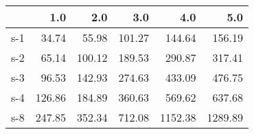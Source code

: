 \begin{tabular}{lrrrrr}
\toprule
{} &    1.0 &    2.0 &    3.0 &     4.0 &     5.0 \\
\midrule
s-1 &  34.74 &  55.98 & 101.27 &  144.64 &  156.19 \\
s-2 &  65.14 & 100.12 & 189.53 &  290.87 &  317.41 \\
s-3 &  96.53 & 142.93 & 274.63 &  433.09 &  476.75 \\
s-4 & 126.86 & 184.89 & 360.63 &  569.62 &  637.68 \\
s-8 & 247.85 & 352.34 & 712.08 & 1152.38 & 1289.89 \\
\bottomrule
\end{tabular}
